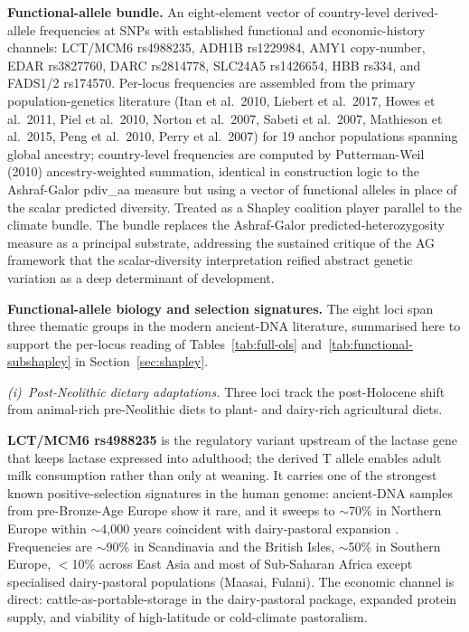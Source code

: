 \documentclass[11pt,letterpaper]{article}
\begin{document}
\textbf{Functional-allele bundle.} An eight-element vector of country-level derived-allele frequencies at SNPs with established functional and economic-history channels: LCT/MCM6 rs4988235, ADH1B rs1229984, AMY1 copy-number, EDAR rs3827760, DARC rs2814778, SLC24A5 rs1426654, HBB rs334, and FADS1/2 rs174570. Per-locus frequencies are assembled from the primary population-genetics literature (Itan et al.\ 2010, Liebert et al.\ 2017, Howes et al.\ 2011, Piel et al.\ 2010, Norton et al.\ 2007, Sabeti et al.\ 2007, Mathieson et al.\ 2015, Peng et al.\ 2010, Perry et al.\ 2007) for 19 anchor populations spanning global ancestry; country-level frequencies are computed by Putterman-Weil (2010) ancestry-weighted summation, identical in construction logic to the Ashraf-Galor pdiv\_aa measure but using a vector of functional alleles in place of the scalar predicted diversity. Treated as a Shapley coalition player parallel to the climate bundle. The bundle replaces the Ashraf-Galor predicted-heterozygosity measure as a principal substrate, addressing the sustained critique of the AG framework that the scalar-diversity interpretation reified abstract genetic variation as a deep determinant of development.

\textbf{Functional-allele biology and selection signatures.} The eight loci span three thematic groups in the modern ancient-DNA literature, summarised here to support the per-locus reading of Tables~\ref{tab:full-ols} and~\ref{tab:functional-subshapley} in Section~\ref{sec:shapley}.

\emph{(i)~Post-Neolithic dietary adaptations.} Three loci track the post-Holocene shift from animal-rich pre-Neolithic diets to plant- and dairy-rich agricultural diets.

\textbf{LCT/MCM6 rs4988235} is the regulatory variant upstream of the lactase gene that keeps lactase expressed into adulthood; the derived T allele enables adult milk consumption rather than only at weaning. It carries one of the strongest known positive-selection signatures in the human genome: ancient-DNA samples from pre-Bronze-Age Europe show it rare, and it sweeps to $\sim$70\% in Northern Europe within $\sim$4{,}000 years coincident with dairy-pastoral expansion \citep{mathieson2015,allentoft2015}. Frequencies are $\sim$90\% in Scandinavia and the British Isles, $\sim$50\% in Southern Europe, $<$10\% across East Asia and most of Sub-Saharan Africa except specialised dairy-pastoral populations (Maasai, Fulani). The economic channel is direct: cattle-as-portable-storage in the dairy-pastoral package, expanded protein supply, and viability of high-latitude or cold-climate pastoralism.
\end{document}
